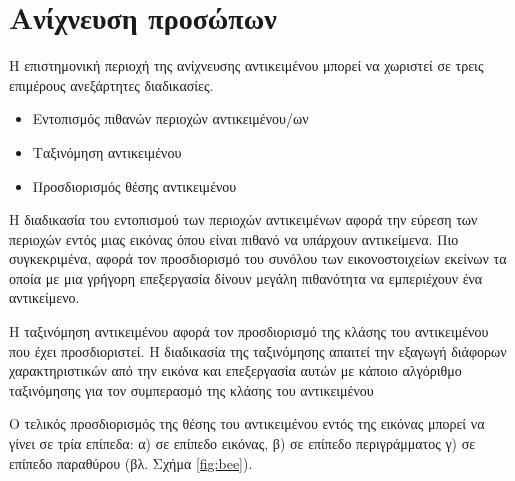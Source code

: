 \chapter{Ανίχνευση προσώπων}\label{ch:facedetection}
Η επιστημονική περιοχή της ανίχνευσης αντικειμένου μπορεί να χωριστεί
σε τρεις επιμέρους ανεξάρτητες διαδικασίες.
\begin{itemize}
    \item Εντοπισμός πιθανών περιοχών αντικειμένου/ων
    \item Ταξινόμηση αντικειμένου
    \item Προσδιορισμός θέσης αντικειμένου
\end{itemize}


H διαδικασία του εντοπισμού των περιοχών αντικειμένων αφορά την εύρεση των περιοχών
εντός μιας εικόνας όπου είναι πιθανό να υπάρχουν αντικείμενα. Πιο συγκεκριμένα, αφορά τον προσδιορισμό
του συνόλου των εικονοστοιχείων εκείνων τα οποία με μια γρήγορη επεξεργασία δίνουν
μεγάλη πιθανότητα να εμπεριέχουν ένα αντικείμενο.

Η ταξινόμηση αντικειμένου αφορά τον προσδιορισμό της κλάσης του αντικειμένου που
έχει προσδιοριστεί. Η διαδικασία της ταξινόμησης απαιτεί την εξαγωγή διάφορων
χαρακτηριστικών από την εικόνα και επεξεργασία αυτών με κάποιο αλγόριθμο ταξινόμησης
για τον συμπερασμό της κλάσης του αντικειμένου

Ο τελικός προσδιορισμός της θέσης του αντικειμένου εντός της εικόνας μπορεί να γίνει σε
τρία επίπεδα: α) σε επίπεδο εικόνας, β) σε επίπεδο περιγράμματος γ) σε επίπεδο παραθύρου
(βλ. Σχήμα \ref{fig:bee}).

